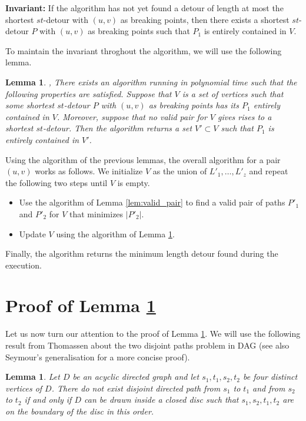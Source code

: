 \documentclass[utf8,11pt]{article}
\theoremstyle{plain}
\newtheorem{lemma}[theorem]{Lemma}
\theoremstyle{definition}
\begin{document}
\textbf{Invariant:} If the algorithm has not yet found a detour of length at most the shortest $st$-detour with $(u,v)$ as breaking points, then there exists a shortest $st$-detour $P$ with $(u,v)$ as breaking points such that $P_1$ is entirely contained in $V$.

To maintain the invariant throghout the algorithm, we will use the following lemma. 

\begin{lemma}\label{lem:update_V},
    There exists an algorithm running in polynomial time such that the following properties are satisfied. 
    Suppose that $V$ is a set of vertices such that some shortest $st$-detour $P$ with $(u,v)$ as breaking points has its $P_1$ entirely contained in $V$. Moreover, suppose that no valid pair for $V$ gives rises to a shortest $st$-detour. Then the algorithm returns a set $V' \subset V$ such that $P_1$ is entirely contained in $V'$.
\end{lemma}

Using the algorithm of the previous lemmas, the overall algorithm for a pair $(u,v)$ works as follows. We initialize $V$ as the union of $L'_1, \dots, L'_{z}$ and repeat the following two steps until $V$ is empty.
\begin{itemize}
    \item Use the algorithm of Lemma \ref{lem:valid_pair} to find a valid pair of paths $P'_1$ and $P'_2$ for $V$ that minimizes $|P'_2|$. 
    \item Update $V$ using the algorithm of Lemma \ref{lem:update_V}.
\end{itemize}
Finally, the algorithm returns the minimum length detour found during the execution.

\section*{Proof of Lemma \ref{lem:update_V}}
Let us now turn our attention to the proof of Lemma \ref{lem:update_V}. We will use the following result from Thomassen about the two disjoint paths problem in DAG (see also Seymour's generalisation for a more concise proof). 

\begin{lemma}\label{lem:Thomassen}
    Let $D$ be an acyclic directed graph and let $s_1, t_1, s_2, t_2$ be four distinct vertices of $D$. There do not exist disjoint directed path from $s_1$ to $t_1$ and from $s_2$ to $t_2$ if and only if $D$ can be drawn inside a closed disc such that $s_1, s_2, t_1, t_2$ are on the boundary of the disc in this order. 
\end{lemma}
\end{document}
